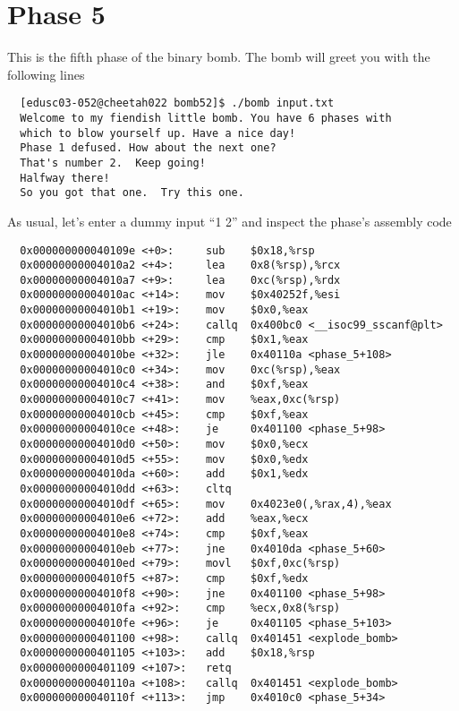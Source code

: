 \section{Phase 5}
This is the fifth phase of the binary bomb. The bomb will greet you with the following lines
{\renewcommand\fcolorbox[4][]{\textcolor{black}{\strut#4}}
\begin{verbatim}
  [edusc03-052@cheetah022 bomb52]$ ./bomb input.txt
  Welcome to my fiendish little bomb. You have 6 phases with
  which to blow yourself up. Have a nice day!
  Phase 1 defused. How about the next one?
  That's number 2.  Keep going!
  Halfway there!
  So you got that one.  Try this one.
\end{verbatim}
}\noindent
As usual, let's enter a dummy input ``1 2'' and inspect the phase's assembly code
{\renewcommand\fcolorbox[4][]{\textcolor{cyan}{\strut#4}}
\begin{verbatim}
  0x000000000040109e <+0>:     sub    $0x18,%rsp
  0x00000000004010a2 <+4>:     lea    0x8(%rsp),%rcx
  0x00000000004010a7 <+9>:     lea    0xc(%rsp),%rdx
  0x00000000004010ac <+14>:    mov    $0x40252f,%esi
  0x00000000004010b1 <+19>:    mov    $0x0,%eax
  0x00000000004010b6 <+24>:    callq  0x400bc0 <__isoc99_sscanf@plt>
  0x00000000004010bb <+29>:    cmp    $0x1,%eax
  0x00000000004010be <+32>:    jle    0x40110a <phase_5+108>
  0x00000000004010c0 <+34>:    mov    0xc(%rsp),%eax
  0x00000000004010c4 <+38>:    and    $0xf,%eax
  0x00000000004010c7 <+41>:    mov    %eax,0xc(%rsp)
  0x00000000004010cb <+45>:    cmp    $0xf,%eax
  0x00000000004010ce <+48>:    je     0x401100 <phase_5+98>
  0x00000000004010d0 <+50>:    mov    $0x0,%ecx
  0x00000000004010d5 <+55>:    mov    $0x0,%edx
  0x00000000004010da <+60>:    add    $0x1,%edx
  0x00000000004010dd <+63>:    cltq
  0x00000000004010df <+65>:    mov    0x4023e0(,%rax,4),%eax
  0x00000000004010e6 <+72>:    add    %eax,%ecx
  0x00000000004010e8 <+74>:    cmp    $0xf,%eax
  0x00000000004010eb <+77>:    jne    0x4010da <phase_5+60>
  0x00000000004010ed <+79>:    movl   $0xf,0xc(%rsp)
  0x00000000004010f5 <+87>:    cmp    $0xf,%edx
  0x00000000004010f8 <+90>:    jne    0x401100 <phase_5+98>
  0x00000000004010fa <+92>:    cmp    %ecx,0x8(%rsp)
  0x00000000004010fe <+96>:    je     0x401105 <phase_5+103>
  0x0000000000401100 <+98>:    callq  0x401451 <explode_bomb>
  0x0000000000401105 <+103>:   add    $0x18,%rsp
  0x0000000000401109 <+107>:   retq
  0x000000000040110a <+108>:   callq  0x401451 <explode_bomb>
  0x000000000040110f <+113>:   jmp    0x4010c0 <phase_5+34>
\end{verbatim}
}\noindent
